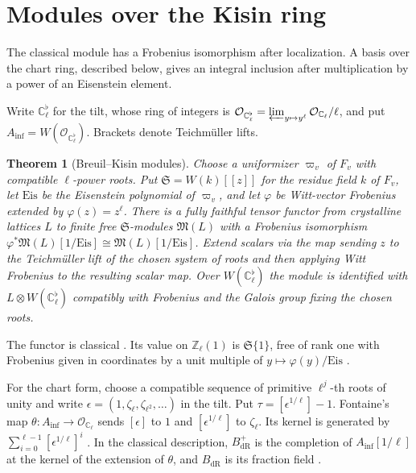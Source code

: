 \documentclass[reqno]{amsart}
\theoremstyle{definition}
\theoremstyle{plain}
\newtheorem{theorem}{Theorem}[section]
\theoremstyle{remark}
\newcommand{\Z}{\mathbb Z}
\newcommand{\C}{\mathbb C}
\newcommand{\Bdr}{B_{\mathrm{dR}}}
\newcommand{\Ainf}{A_{\mathrm{inf}}}
\newcommand{\Eis}{\mathrm{Eis}}
\begin{document}
\section{Modules over the Kisin ring}\label{sec:kisin}

The classical module has a Frobenius isomorphism after localization.
A basis over the chart ring, described below, gives an integral inclusion after multiplication by a
power of an Eisenstein element.

Write \(\C_\ell^\flat\) for the tilt, whose ring of integers is
\(\mathcal O_{\C_\ell^\flat}=\varprojlim_{y\mapsto y^\ell}
\mathcal O_{\C_\ell}/\ell\), and put \(\Ainf=W(\mathcal O_{\C_\ell^\flat})\).
Brackets denote Teichm\"uller lifts.

\begin{theorem}[Breuil--Kisin modules]\label{thm:kisin}
Choose a uniformizer \(\varpi_v\) of \(F_v\) with compatible \(\ell\)-power
roots. Put \(\mathfrak S=W(k)[[z]]\) for the residue field \(k\) of \(F_v\),
let \(\Eis\) be the Eisenstein polynomial of \(\varpi_v\), and let
\(\varphi\) be Witt-vector Frobenius extended by \(\varphi(z)=z^\ell\).
There is a fully faithful tensor functor from crystalline lattices \(L\)
to finite free \(\mathfrak S\)-modules \(\mathfrak M(L)\) with a
Frobenius isomorphism \(\varphi^*\mathfrak M(L)[1/\Eis]\cong
\mathfrak M(L)[1/\Eis]\). Extend scalars via the map sending \(z\) to the
Teichm\"uller lift of the chosen system of roots and then applying Witt
Frobenius to the resulting scalar map. Over \(W(\C_\ell^\flat)\)
the module is identified with \(L\otimes W(\C_\ell^\flat)\) compatibly
with Frobenius and the Galois group fixing the chosen roots.
\end{theorem}

The functor is classical \cite{Ki}\cite[Theorem~4.4]{BMS}. Its value on
\(\Z_\ell(1)\) is \(\mathfrak S\{1\}\), free of rank one with Frobenius
given in coordinates by a unit multiple of
\(y\mapsto \varphi(y)/\Eis\) \cite[Example~4.2 and Corollary~4.33]{BMS}.

For the chart form, choose a compatible sequence of primitive
\(\ell^j\)-th roots of unity and write
\(\epsilon=(1,\zeta_\ell,\zeta_{\ell^2},\ldots)\) in the tilt.
Put \(\tau=[\epsilon^{1/\ell}]-1\). Fontaine's map
\(\theta\colon\Ainf\to\mathcal O_{\C_\ell}\) sends \([\epsilon]\) to \(1\)
and \([\epsilon^{1/\ell}]\) to \(\zeta_\ell\). Its kernel is generated by
\(\sum_{i=0}^{\ell-1}[\epsilon^{1/\ell}]^i\) \cite[Example~3.16]{BMS}.
In the classical description, \(\Bdr^+\) is the completion of
\(\Ainf[1/\ell]\) at the kernel of the extension of \(\theta\), and
\(\Bdr\) is its fraction field \cite{Co}.
\end{document}
